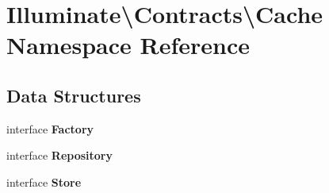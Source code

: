 \section{Illuminate\textbackslash{}Contracts\textbackslash{}Cache Namespace Reference}
\label{namespace_illuminate_1_1_contracts_1_1_cache}
\subsection*{Data Structures}
\begin{DoxyCompactItemize}
\item 
interface {\bf Factory}
\item 
interface {\bf Repository}
\item 
interface {\bf Store}
\end{DoxyCompactItemize}
